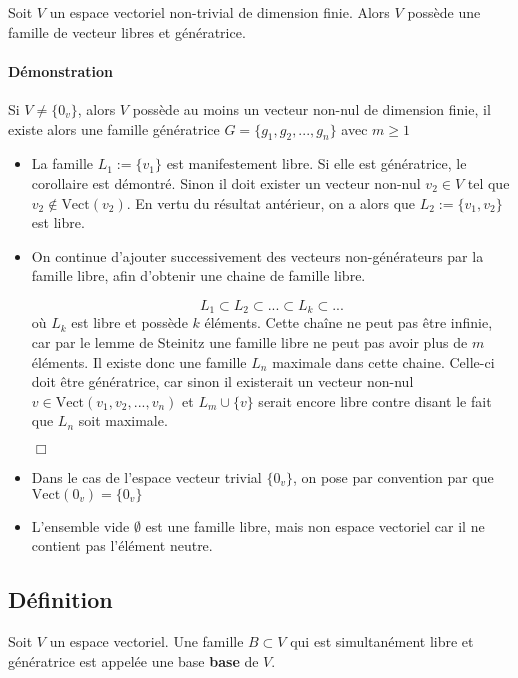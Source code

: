 \documentclass[
    11pt,
    a4paper,
    oneside,
    headinlcude, footinclude,
    twoside,
]{report}
\newcommand{\cqfd}[0]{
    \begin{flushright}$\Box$\end{flushright}
}
\begin{document}
Soit $V$ un espace vectoriel non-trivial de dimension finie. Alors $V$ possède
une famille de vecteur libres et génératrice.


\paragraph{Démonstration}
\label{par:demonstration}

Si $V \neq \{0_{v}\}$, alors $V$ possède au moins un vecteur non-nul de dimension
finie, il existe alors une famille génératrice $G = \{g_{1}, g_{2}, ..., g_{n}\}$
avec $m \geq 1$

\begin{itemize}
    \item La famille $L_{1} := \{v_{1}\}$ est manifestement libre. Si elle est
        génératrice, le corollaire est démontré. Sinon il doit exister un
        vecteur non-nul $v_{2} \in V$ tel que $v_{2} \notin
        \text{Vect}(v_{2})$. En vertu du résultat antérieur, on a alors que $L_{2}
        := \{v_{1}, v_{2}\}$ est libre.
    \item On continue d'ajouter successivement des vecteurs non-générateurs
        par la famille libre, afin d'obtenir une chaine de famille libre.

        $$L_{1} \subset L_{2} \subset ... \subset L_{k} \subset ...$$
        où $L_{k}$ est libre et possède $k$ éléments. Cette cha\^ine ne peut
        pas être infinie, car par le lemme de Steinitz une famille libre ne
        peut pas avoir plus de $m$ éléments. Il existe donc une famille $L_{n}$
        maximale dans cette chaine. Celle-ci doit être génératrice, car sinon
        il existerait un vecteur non-nul $v \in \text{Vect}(v_{1}, v_{2}, ...,
        v_{n})$ et $L_{m} \cup \{v\}$ serait encore libre contre disant le
        fait que $L_{n}$ soit maximale.
        \cqfd
    \item Dans le cas de l'espace vecteur trivial $\{0_{v}\}$, on pose par
        convention par que $\text{Vect}(0_{v}) = \{0_{v}\}$ 
    \item L'ensemble vide $\emptyset$ est une famille libre, mais non espace
        vectoriel car il ne contient pas l'élément neutre.
\end{itemize}

\subsection{Définition}
\label{sub:definition}

Soit $V$ un espace vectoriel. Une famille $B \subset V $ qui est simultanément
libre et génératrice est appelée une base \textbf{base} de $V$.
\end{document}
